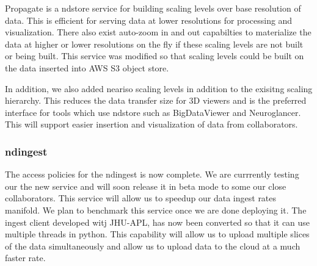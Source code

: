 \documentclass[simplex.tex]{subfiles}
\begin{document}
Propagate is a ndstore service for building scaling levels over base resolution of data. This is efficient for serving data at lower resolutions for processing and visualization. There also exist auto-zoom in and out capabilties to materialize the data at higher or lower resolutions on the fly if these scaling levels are not built or being built. This service was modified so that scaling levels could be built on the data inserted into AWS S3 object store. \par

In addition, we also added neariso scaling levels in addition to the exisitng scaling hierarchy. This reduces the data transfer size for 3D viewers and is the preferred interface for tools which use ndstore such as BigDataViewer and Neuroglancer. This will support easier insertion and visualization of data from collaborators. \par

\subsubsection{ndingest}

The access policies for the ndingest is now complete. We are currrently testing our the new service and will soon release it in beta mode to some our close collaborators. This service will allow us to speedup our data ingest rates manifold. We plan to benchmark this service once we are done deploying it.
%
The ingest client developed witj JHU-APL, has now been converted so that it can use multiple threads in python. This capability will allow us to upload multiple slices of the data simultaneously and allow us to upload data to the cloud at a much faster rate. 

\clearpage
\end{document}
